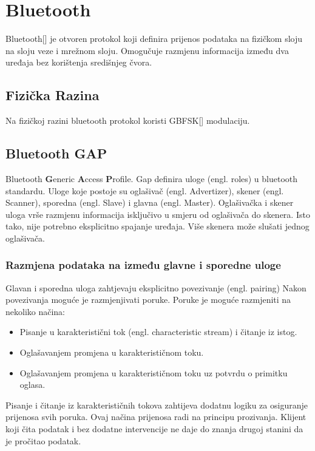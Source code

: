 \documentclass[times, utf8, diplomski]{diplomski}
\begin{document}
\newpage
\section{Bluetooth}
Bluetooth[\cite{core41}] je otvoren protokol koji definira prijenos podataka na fizičkom sloju na sloju veze i mrežnom sloju. Omogučuje razmjenu informacija između dva uređaja bez korištenja središnjeg čvora.

\subsection {Fizička Razina}
Na fizičkoj razini bluetooth protokol koristi GBFSK[\cite{GBFSK}] modulaciju.

\subsection{Bluetooth GAP}
Bluetooth \textbf{G}eneric \textbf{A}ccess \textbf{P}rofile.
Gap definira uloge (engl. roles) u bluetooth standardu. Uloge koje postoje su oglašivač (engl. Advertizer), skener (engl. Scanner), sporedna (engl. Slave) i glavna (engl. Master). Oglašivačka i skener uloga vrše razmjenu informacija isključivo u smjeru od oglašivača do skenera. Isto tako, nije potrebno eksplicitno spajanje uređaja.
Više skenera može slušati jednog oglašivača.

\subsubsection {Razmjena podataka na između glavne i sporedne uloge}
Glavan i sporedna uloga zahtjevaju eksplicitno povezivanje (engl. pairing) Nakon povezivanja moguće je razmjenjivati poruke. Poruke je moguće razmjeniti na nekoliko načina:

\begin{itemize}
  \item Pisanje u karakteristični tok (engl. characteristic stream) i čitanje iz istog.
  \item Oglašavanjem promjena u karakterističnom toku.
  \item Oglašavanjem promjena u karakterističnom toku uz potvrdu o primitku oglasa.
\end{itemize}

Pisanje i čitanje iz karakterističnih tokova zahtijeva dodatnu logiku za osiguranje prijenosa svih poruka. Ovaj načina prijenosa radi na principu prozivanja. Klijent koji čita podatak i bez dodatne intervencije ne daje do znanja drugoj stanini da je pročitao podatak.
\end{document}
